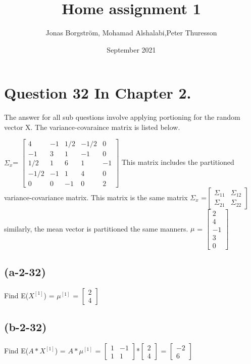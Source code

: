 \documentclass{article}
\title{Home assignment 1}
\author{Jonas Borgström, Mohamad Alshalabi,Peter Thuresson}
\date{September 2021}
\begin{document}
\maketitle

\section{Question 32 In Chapter 2.}

The answer for all sub questions involve applying portioning for the random vector X. 
The variance-covaraince matrix is listed below. 
\newline 
 

 $\Sigma_x$= $\left[
\begin{array}{cc|ccc}
4 & -1 & 1/2 & -1/2 & 0\\
-1 & 3 & 1 & -1 & 0\\ \hline
1/2 & 1 & 6 & 1 & -1\\ 
-1/2 & -1 & 1 & 4 & 0\\ 
0 & 0 & -1 & 0 & 2
\end{array}
\right]
$\newline
This matrix includes the partitioned variance-covariance matrix.\newline 
This matrix is the same matrix 
$\Sigma_x$ =$\left[
\begin{array}{cc}
\Sigma_{11} & \Sigma_{12} \\
\Sigma_{21} & \Sigma_{22}
\end{array}
\right]$
similarly, the mean vector is partitioned the same manners.\newline 
$\mu$ = $\left[
\begin{array}{c}
2\\
4\\ \hline
-1\\
3\\
0
\end{array}
\right]
$\newline
\subsection{(a-2-32)}
Find E($X^{[1]} $) = $\mu^ {[1] }$ = $\left[
\begin{array}{c}
2\\
4
\end{array}
\right]
$\newline
\subsection{(b-2-32)}
Find  E($A*X^{[1]} $) = $A*\mu^{[1]}$ = $\left[
\begin{array}{cc}
1 & -1 \\
1 & 1
\end{array}
\right]
$*$\left[
\begin{array}{c}
2\\
4
\end{array}
\right]
$ = $\left[
\begin{array}{c}
-2\\
6
\end{array}
\right]
$\newline
\end{document}
